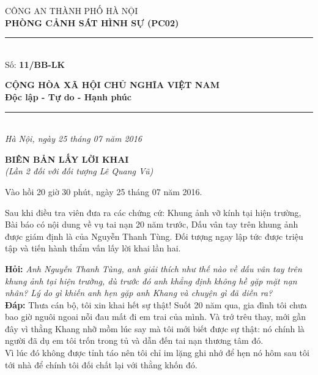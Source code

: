 \documentclass[12pt,a4paper]{article}
\begin{document}
\noindent
\begin{minipage}[t]{0.46\textwidth}
    \begin{center}
        \fontsize{11pt}{13pt}\selectfont
        CÔNG AN THÀNH PHỐ HÀ NỘI\\
        \textbf{PHÒNG CẢNH SÁT HÌNH SỰ (PC02)}\\[-0.2em]
        \rule{3.2cm}{0.6pt}\\[0.25cm]
        \fontsize{11pt}{13pt}\selectfont Số: \textbf{11/BB-LK}
    \end{center}
\end{minipage}
\hfill
\begin{minipage}[t]{0.52\textwidth}
    \begin{center}
        \fontsize{11pt}{13pt}\selectfont
        \textbf{CỘNG HÒA XÃ HỘI CHỦ NGHĨA VIỆT NAM}\\
        \textbf{Độc lập - Tự do - Hạnh phúc}\\[-0.2em]
        \rule{3.6cm}{0.6pt}\\[0.25cm]
        \textit{Hà Nội, ngày 25 tháng 07 năm 2016}
    \end{center}
\end{minipage}

\vspace{0.5cm}

\begin{center}
    \textbf{\Large BIÊN BẢN LẤY LỜI KHAI}\\[0.15cm]
    \textit{(Lần 2 đối với đối tượng Lê Quang Vũ)}
\end{center}

\vspace{0.3cm}


Vào hồi 20 giờ 30 phút, ngày 25 tháng 07 năm 2016.

Sau khi điều tra viên đưa ra các chứng cứ: Khung ảnh vỡ kính tại hiện trường, Bài báo có nội dung về vụ tai nạn 20 năm trước, Dấu vân tay trên khung ảnh được giám định là của Nguyễn Thanh Tùng. Đối tượng ngay lập tức được triệu tập và tiến hành thẩm vấn lấy lời khai lần hai.


\noindent\textbf{Hỏi:} \textit{Anh Nguyễn Thanh Tùng, anh giải thích như thế nào về dấu vân tay trên khung ảnh tại hiện trường, dù trước đó anh khẳng định không hề gặp mặt nạn nhân? Lý do gì khiến anh hẹn gặp anh Khang và chuyện gì đã diễn ra?}\\[0.15cm]

\noindent\textbf{Đáp:} Thưa cán bộ, tôi xin khai hết sự thật! Suốt 20 năm qua, gia đình tôi chưa bao giờ nguôi ngoai nỗi đau mất đi em trai của mình. Và trớ trêu thay, mới gần đây vì thằng Khang nhỡ mồm lúc say mà tôi mới biết được sự thật: nó chính là người đã dụ em tôi trốn trong tủ và dẫn đến tai nạn thương tâm đó.\\[0.35cm]
Vì lúc đó không được tỉnh táo nên tôi chỉ im lặng ghi nhớ để hẹn nó hôm sau tôi tới nhà để chính tôi đối chất lại với thằng khốn đó.
\end{document}
